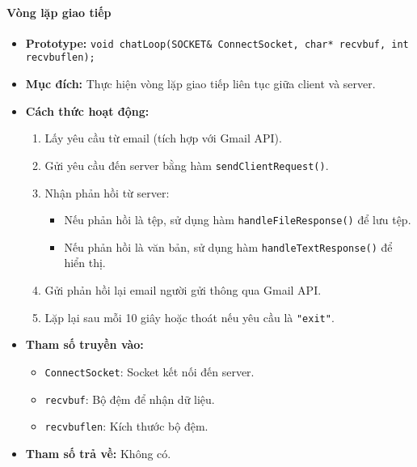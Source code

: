 \paragraph{\textbf{Vòng lặp giao tiếp}}
\begin{itemize}
    \item \textbf{Prototype:} \texttt{void chatLoop(SOCKET\& ConnectSocket, char* recvbuf, int recvbuflen);}
    
    \item \textbf{Mục đích:} Thực hiện vòng lặp giao tiếp liên tục giữa client và server.
    
    \item \textbf{Cách thức hoạt động:} 
    \begin{enumerate}
        \item Lấy yêu cầu từ email (tích hợp với Gmail API).
        \item Gửi yêu cầu đến server bằng hàm \texttt{sendClientRequest()}.
        \item Nhận phản hồi từ server:
        \begin{itemize}
            \item Nếu phản hồi là tệp, sử dụng hàm \texttt{handleFileResponse()} để lưu tệp.
            \item Nếu phản hồi là văn bản, sử dụng hàm \texttt{handleTextResponse()} để hiển thị.
        \end{itemize}
        \item Gửi phản hồi lại email người gửi thông qua Gmail API.
        \item Lặp lại sau mỗi 10 giây hoặc thoát nếu yêu cầu là \texttt{"exit"}.
    \end{enumerate}
    
    \item \textbf{Tham số truyền vào:} 
    \begin{itemize}
        \item \texttt{ConnectSocket}: Socket kết nối đến server.
        \item \texttt{recvbuf}: Bộ đệm để nhận dữ liệu.
        \item \texttt{recvbuflen}: Kích thước bộ đệm.
    \end{itemize}
    
    \item \textbf{Tham số trả về:} Không có.
\end{itemize}

